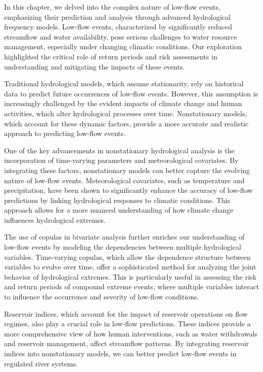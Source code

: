 \documentclass[
]{krantz}
\begin{document}
In this chapter, we delved into the complex nature of low-flow events, emphasizing their prediction and analysis through advanced hydrological frequency models. Low-flow events, characterized by significantly reduced streamflow and water availability, pose serious challenges to water resource management, especially under changing climatic conditions. Our exploration highlighted the critical role of return periods and risk assessments in understanding and mitigating the impacts of these events.

Traditional hydrological models, which assume stationarity, rely on historical data to predict future occurrences of low-flow events. However, this assumption is increasingly challenged by the evident impacts of climate change and human activities, which alter hydrological processes over time. Nonstationary models, which account for these dynamic factors, provide a more accurate and realistic approach to predicting low-flow events.

One of the key advancements in nonstationary hydrological analysis is the incorporation of time-varying parameters and meteorological covariates. By integrating these factors, nonstationary models can better capture the evolving nature of low-flow events. Meteorological covariates, such as temperature and precipitation, have been shown to significantly enhance the accuracy of low-flow predictions by linking hydrological responses to climatic conditions. This approach allows for a more nuanced understanding of how climate change influences hydrological extremes.

The use of copulas in bivariate analysis further enriches our understanding of low-flow events by modeling the dependencies between multiple hydrological variables. Time-varying copulas, which allow the dependence structure between variables to evolve over time, offer a sophisticated method for analyzing the joint behavior of hydrological extremes. This is particularly useful in assessing the risk and return periods of compound extreme events, where multiple variables interact to influence the occurrence and severity of low-flow conditions.

Reservoir indices, which account for the impact of reservoir operations on flow regimes, also play a crucial role in low-flow predictions. These indices provide a more comprehensive view of how human interventions, such as water withdrawals and reservoir management, affect streamflow patterns. By integrating reservoir indices into nonstationary models, we can better predict low-flow events in regulated river systems.
\end{document}

